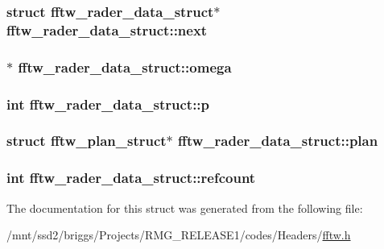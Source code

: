 \hypertarget{structfftw__rader__data__struct_add6c58655fd3f3a60398822f85d7d5b3}{
\subsubsection[{next}]{\setlength{\rightskip}{0pt plus 5cm}struct {\bf fftw\-\_\-rader\-\_\-data\-\_\-struct}$\ast$ fftw\-\_\-rader\-\_\-data\-\_\-struct\-::next}}\label{structfftw__rader__data__struct_add6c58655fd3f3a60398822f85d7d5b3}
\hypertarget{structfftw__rader__data__struct_ad1d3d661e6e97fae6126859ca63a48ea}{
\subsubsection[{omega}]{$\ast$ fftw\-\_\-rader\-\_\-data\-\_\-struct\-::omega}}\label{structfftw__rader__data__struct_ad1d3d661e6e97fae6126859ca63a48ea}
\hypertarget{structfftw__rader__data__struct_a7c62f135742d0c0a3303950f78421815}{
\subsubsection[{p}]{\setlength{\rightskip}{0pt plus 5cm}int fftw\-\_\-rader\-\_\-data\-\_\-struct\-::p}}\label{structfftw__rader__data__struct_a7c62f135742d0c0a3303950f78421815}
\hypertarget{structfftw__rader__data__struct_aa0fdaee84fabe8a6ecb74ea4a05ab122}{
\subsubsection[{plan}]{\setlength{\rightskip}{0pt plus 5cm}struct {\bf fftw\-\_\-plan\-\_\-struct}$\ast$ fftw\-\_\-rader\-\_\-data\-\_\-struct\-::plan}}\label{structfftw__rader__data__struct_aa0fdaee84fabe8a6ecb74ea4a05ab122}
\hypertarget{structfftw__rader__data__struct_ae8416156b430120934321df66227c97f}{
\subsubsection[{refcount}]{\setlength{\rightskip}{0pt plus 5cm}int fftw\-\_\-rader\-\_\-data\-\_\-struct\-::refcount}}\label{structfftw__rader__data__struct_ae8416156b430120934321df66227c97f}


The documentation for this struct was generated from the following file\-:\begin{DoxyCompactItemize}
\item 
/mnt/ssd2/briggs/\-Projects/\-R\-M\-G\-\_\-\-R\-E\-L\-E\-A\-S\-E1/codes/\-Headers/\hyperlink{fftw_8h}{fftw.\-h}\end{DoxyCompactItemize}
